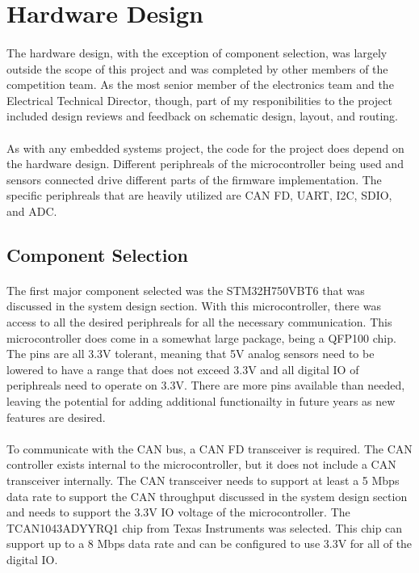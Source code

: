 \section{Hardware Design}

\paragraph{}
The hardware design, with the exception of component selection, was largely outside the scope of this project and was completed by other members of the competition team.
As the most senior member of the electronics team and the Electrical Technical Director, though, part of my responibilities to the project included design reviews and feedback on schematic design, layout, and routing.

\paragraph{}
As with any embedded systems project, the code for the project does depend on the hardware design.
Different periphreals of the microcontroller being used and sensors connected drive different parts of the firmware implementation.
The specific periphreals that are heavily utilized are CAN FD, UART, I2C, SDIO, and ADC.

\subsection{Component Selection}

\paragraph{}
The first major component selected was the STM32H750VBT6 that was discussed in the system design section.
With this microcontroller, there was access to all the desired periphreals for all the necessary communication.
This microcontroller does come in a somewhat large package, being a QFP100 chip.
The pins are all 3.3V tolerant, meaning that 5V analog sensors need to be lowered to have a range that does not exceed 3.3V and all digital IO of periphreals need to operate on 3.3V.
There are more pins available than needed, leaving the potential for adding additional functionailty in future years as new features are desired.

\paragraph{}
To communicate with the CAN bus, a CAN FD transceiver is required.
The CAN controller exists internal to the microcontroller, but it does not include a CAN transceiver internally.
The CAN transceiver needs to support at least a 5 Mbps data rate to support the CAN throughput discussed in the system design section and needs to support the 3.3V IO voltage of the microcontroller.
The TCAN1043ADYYRQ1 chip from Texas Instruments was selected.
This chip can support up to a 8 Mbps data rate and can be configured to use 3.3V for all of the digital IO.

